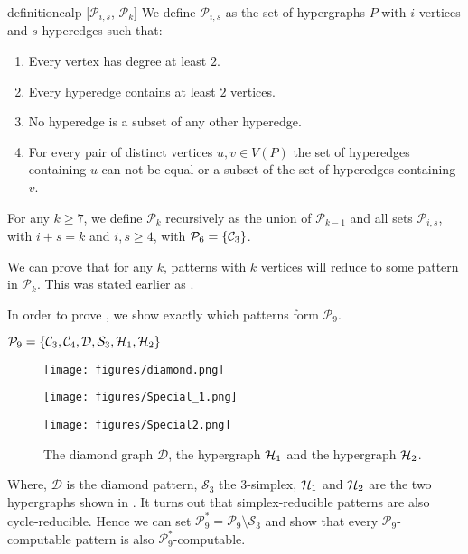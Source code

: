 \documentclass[a4paper,UKenglish,cleveref, autoref, numberwithinsect, thm-restate]{lipics-v2021}
\newcommand{\computable}[1]{${#1}$-computable}
\newcommand{\cycle}[1]{\cC_{#1}}
\newcommand{\simplex}[1]{\cS_{#1}}
\newcommand{\hyperone}{\cH_1}
\newcommand{\hypertwo}{\cH_2}
\newcommand{\diamondgraph}{\cD}
\newcommand{\cC}{{\cal C}}
\newcommand{\cD}{\mathcal{D}}
\newcommand{\cH}{{\cal H}}
\newcommand{\cP}{\mathcal{P}}
\newcommand{\cS}{\mathcal{S}}
\begin{document}
	\begin{restatable}{definition}{calp} [$\mathcal{P}_{i,s}$, $\mathcal{P}_k$] \label{def:group}
		We define $\mathcal{P}_{i,s}$ as the set of hypergraphs $P$ with $i$ vertices and $s$ hyperedges such that:
		\begin{enumerate}
			\item Every vertex has degree at least $2$.
			\item Every hyperedge contains at least $2$ vertices.
			\item No hyperedge is a subset of any other hyperedge.
			\item For every pair of distinct vertices $u,v \in V(P)$ the set of hyperedges containing $u$ can not be equal or a subset of the set of hyperedges containing $v$.
		\end{enumerate}
		For any $k\geq 7$, we define $\mathcal{P}_{k}$ recursively as the union of $\cP_{k-1}$ and all sets $\mathcal{P}_{i,s}$, with $i+s = k$ and $i,s\geq 4$, with $\cP_6=\{\cycle{3}\}$.
	\end{restatable}

	We can prove that for any $k$, patterns with $k$ vertices will reduce to some pattern in $\cP_k$. This was stated earlier as .
\pkcomputable*

	In order to prove , we show exactly which patterns form $\cP_9$.
	
	\begin{lemma} \label{lem:nine_content}
		$
			\cP_9 = \{\cycle{3},\cycle{4},\diamondgraph,\simplex{3},\hyperone, \hypertwo\}
		$
	\end{lemma}
	\begin{figure}[t]
	\centering
	\begin{minipage}{.15\linewidth}
		\centering
		\texttt{[image: figures/diamond.png]}
	\end{minipage}
	\hspace{1cm}
	\begin{minipage}{.15\linewidth}
		\centering
		\texttt{[image: figures/Special\_1.png]}
	\end{minipage}
	\hspace{1cm}
	\begin{minipage}{.2\linewidth}
		\centering
		\texttt{[image: figures/Special2.png]}
	\end{minipage}
	\caption{The diamond graph $\diamondgraph$, the hypergraph $\hyperone$ and the hypergraph $\hypertwo$.} 
	\label{fig:hypers}
	\end{figure}
	Where, $\diamondgraph$ is the diamond pattern, $\simplex{3}$ the $3$-simplex, $\hyperone$ and $\hypertwo$ are the two hypergraphs shown in . It turns out that simplex-reducible patterns are also cycle-reducible. Hence we can set $\cP^*_9 = \cP_9 \setminus \simplex{3}$ and show that every \computable{\cP_9} pattern is also \computable{\cP^*_9}.
	
\end{document}
